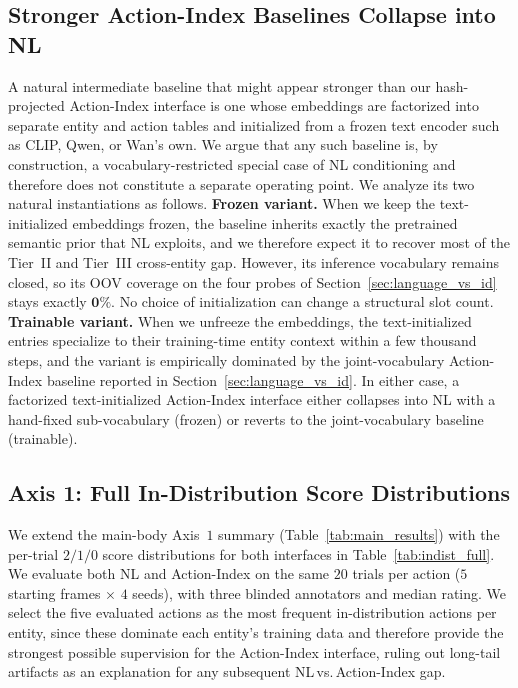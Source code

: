 \subsection{Stronger Action-Index Baselines Collapse into NL}
\label{app:stronger_id}

A natural intermediate baseline that might appear stronger than our hash-projected Action-Index interface is one whose embeddings are factorized into separate entity and action tables and initialized from a frozen text encoder such as CLIP, Qwen, or Wan's own. We argue that any such baseline is, by construction, a vocabulary-restricted special case of NL conditioning and therefore does not constitute a separate operating point. We analyze its two natural instantiations as follows.
\textbf{Frozen variant.} When we keep the text-initialized embeddings frozen, the baseline inherits exactly the pretrained semantic prior that NL exploits, and we therefore expect it to recover most of the Tier~II and Tier~III cross-entity gap. However, its inference vocabulary remains closed, so its OOV coverage on the four probes of Section~\ref{sec:language_vs_id} stays exactly $\mathbf{0}\%$. No choice of initialization can change a structural slot count.
\textbf{Trainable variant.} When we unfreeze the embeddings, the text-initialized entries specialize to their training-time entity context within a few thousand steps, and the variant is empirically dominated by the joint-vocabulary Action-Index baseline reported in Section~\ref{sec:language_vs_id}.
In either case, a factorized text-initialized Action-Index interface either collapses into NL with a hand-fixed sub-vocabulary (frozen) or reverts to the joint-vocabulary baseline (trainable).

\subsection{Axis 1: Full In-Distribution Score Distributions}
\label{app:full_indist}

We extend the main-body Axis~$1$ summary (Table~\ref{tab:main_results}) with the per-trial $2/1/0$ score distributions for both interfaces in Table~\ref{tab:indist_full}. We evaluate both NL and Action-Index on the same $20$ trials per action ($5$ starting frames $\times$ $4$ seeds), with three blinded annotators and median rating. We select the five evaluated actions as the most frequent in-distribution actions per entity, since these dominate each entity's training data and therefore provide the strongest possible supervision for the Action-Index interface, ruling out long-tail artifacts as an explanation for any subsequent NL\,vs.\,Action-Index gap.

